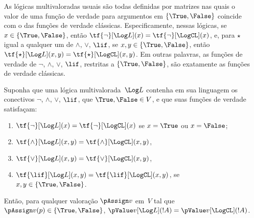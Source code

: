 \documentclass[../../../include/open-logic-section]{subfiles}
\begin{document}


As lógicas multivaloradas usuais são todas definidas por matrizes nas quais
o valor de uma função de verdade para argumentos em $\{\True, \False\}$
coincide com o das funções de verdade clássicas. Especificamente, nessas
lógicas, se $x \in \{\True, \False\}$, então $\tf{\lnot}[\Log L](x) =
\tf{\lnot}[\LogCL](x)$, e, para $\star$ igual a qualquer um de $\land$, $\lor$,
$\lif$, se $x, y \in \{\True, \False\}$, então $\tf{\star}[\Log L](x,y) =
\tf{\star}[\LogCL](x,y)$. Em outras palavras, as funções de verdade de
$\lnot$, $\land$, $\lor$, $\lif$, restritas a $\{\True,\False\}$, são
exatamente as funções de verdade clássicas.

\begin{prop}
  Suponha que uma lógica multivalorada~$\Log L$ contenha em sua linguagem os conectivos
  $\lnot$, $\land$, $\lor$, $\lif$, que $\True, \False \in
  V$, e que suas funções de verdade satisfaçam:
  \begin{enumerate}
    \item{} $\tf{\lnot}[\Log L](x) = \tf{\lnot}[\LogCL](x)$ se $x =
    \True$ ou $x = \False$;
    \item{} $\tf{\land}[\Log L](x,y) = \tf{\land}[\LogCL](x,y)$,
    \item{} $\tf{\lor}[\Log L](x,y) = \tf{\lor}[\LogCL](x,y)$,
    \item{} $\tf{\lif}[\Log L](x,y) = \tf{\lif}[\LogCL](x,y)$,
    se $x, y \in \{\True, \False\}$.
  \end{enumerate}
  Então, para qualquer valoração $\pAssign v$ em~$V$ tal que $\pAssign
  v(p) \in \{\True,\False\}$, $\pValue v[\Log L](!A) = \pValue
  v[\LogCL](!A)$.
\end{prop}
\end{document}

